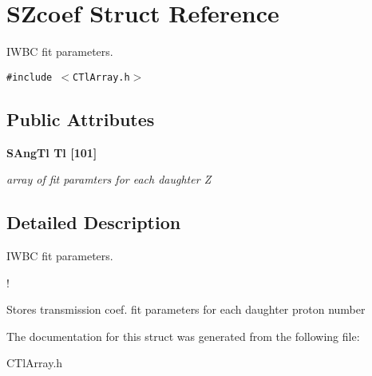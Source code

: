 \section{SZcoef Struct Reference}
\label{structSZcoef}
IWBC fit parameters.  


{\tt \#include $<$CTl\-Array.h$>$}

\subsection*{Public Attributes}
\begin{CompactItemize}
\item 
\bf{SAng\-Tl} \bf{Tl} [101]\label{structSZcoef_34ab59b2991d2f2f5b0e4d1e9adb44db}

\begin{CompactList}\small\item\em array of fit paramters for each daughter Z \item\end{CompactList}\end{CompactItemize}


\subsection{Detailed Description}
IWBC fit parameters. 

!

Stores transmission coef. fit parameters for each daughter proton number 



The documentation for this struct was generated from the following file:\begin{CompactItemize}
\item 
CTl\-Array.h\end{CompactItemize}
